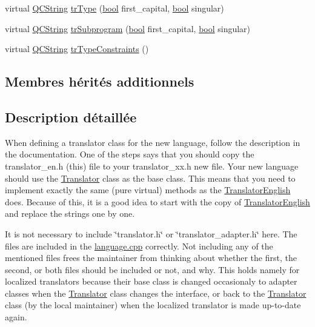 \begin{DoxyCompactItemize}
\item 
virtual \hyperlink{class_q_c_string}{Q\+C\+String} \hyperlink{class_translator_serbian_cyrillic_ae4ba0340508549f9ae7710327bc889f7}{tr\+Type} (\hyperlink{qglobal_8h_a1062901a7428fdd9c7f180f5e01ea056}{bool} first\+\_\+capital, \hyperlink{qglobal_8h_a1062901a7428fdd9c7f180f5e01ea056}{bool} singular)
\item 
virtual \hyperlink{class_q_c_string}{Q\+C\+String} \hyperlink{class_translator_serbian_cyrillic_a53faf51c1508a37733276e401ac80f79}{tr\+Subprogram} (\hyperlink{qglobal_8h_a1062901a7428fdd9c7f180f5e01ea056}{bool} first\+\_\+capital, \hyperlink{qglobal_8h_a1062901a7428fdd9c7f180f5e01ea056}{bool} singular)
\item 
virtual \hyperlink{class_q_c_string}{Q\+C\+String} \hyperlink{class_translator_serbian_cyrillic_ace146e018cda2988db635d61e61646c0}{tr\+Type\+Constraints} ()
\end{DoxyCompactItemize}
\subsection*{Membres hérités additionnels}


\subsection{Description détaillée}
When defining a translator class for the new language, follow the description in the documentation. One of the steps says that you should copy the translator\+\_\+en.\+h (this) file to your translator\+\_\+xx.\+h new file. Your new language should use the \hyperlink{class_translator}{Translator} class as the base class. This means that you need to implement exactly the same (pure virtual) methods as the \hyperlink{class_translator_english}{Translator\+English} does. Because of this, it is a good idea to start with the copy of \hyperlink{class_translator_english}{Translator\+English} and replace the strings one by one.

It is not necessary to include \char`\"{}translator.\+h\char`\"{} or \char`\"{}translator\+\_\+adapter.\+h\char`\"{} here. The files are included in the \hyperlink{language_8cpp}{language.\+cpp} correctly. Not including any of the mentioned files frees the maintainer from thinking about whether the first, the second, or both files should be included or not, and why. This holds namely for localized translators because their base class is changed occasionaly to adapter classes when the \hyperlink{class_translator}{Translator} class changes the interface, or back to the \hyperlink{class_translator}{Translator} class (by the local maintainer) when the localized translator is made up-\/to-\/date again. 

